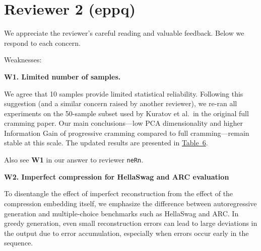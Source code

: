 \section{Reviewer 2 (eppq)}

We appreciate the reviewer's careful reading and valuable feedback. Below we respond to each concern.


Weaknesses:

\textbf{W1. Limited number of samples. }

We agree that 10 samples provide limited statistical reliability. Following this
suggestion (and a similar concern raised by another reviewer), we re-ran all experiments
on the 50-sample subset used by Kuratov et al.\ in the original full cramming paper.
Our main conclusions---low PCA dimensionality and higher Information Gain of progressive
cramming compared to full cramming---remain stable at this scale. The updated results
are presented in \href{https://drive.google.com/file/d/148Cxg2jOx_-MIH5XC0I-oPbwVLG0Ktiz/view?usp=sharing}{Table~6}.

Also see \textbf{W1} in our answer to reviewer \texttt{neRn}.


\textbf{W2. Imperfect compression for HellaSwag and ARC evaluation}

To disentangle the effect of imperfect reconstruction from the effect of the compression embedding itself, we emphasize the difference between autoregressive generation and multiple-choice benchmarks such as HellaSwag and ARC. In greedy generation, even small reconstruction errors can lead to large deviations in the output due to error accumulation, especially when errors occur early in the sequence.

